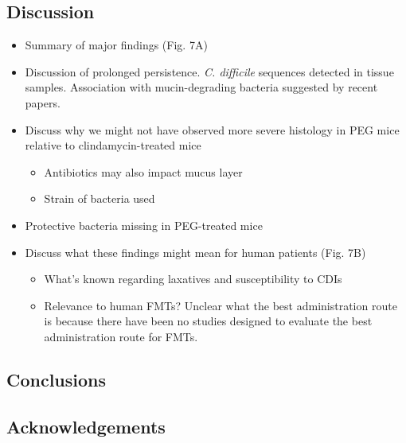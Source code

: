 \documentclass[
  11pt,
]{article}
\providecommand{\tightlist}{%
  \setlength{\itemsep}{0pt}\setlength{\parskip}{0pt}}
\begin{document}
\hypertarget{discussion}{%
\subsection{Discussion}\label{discussion}}

\begin{itemize}
\item
  Summary of major findings (Fig. 7A)
\item
  Discussion of prolonged persistence. \emph{C. difficile} sequences
  detected in tissue samples. Association with mucin-degrading bacteria
  suggested by recent papers.
\item
  Discuss why we might not have observed more severe histology in PEG
  mice relative to clindamycin-treated mice

  \begin{itemize}
  \tightlist
  \item
    Antibiotics may also impact mucus layer
  \item
    Strain of bacteria used
  \end{itemize}
\item
  Protective bacteria missing in PEG-treated mice
\item
  Discuss what these findings might mean for human patients (Fig. 7B)

  \begin{itemize}
  \tightlist
  \item
    What's known regarding laxatives and susceptibility to CDIs
  \item
    Relevance to human FMTs? Unclear what the best administration route
    is because there have been no studies designed to evaluate the best
    administration route for FMTs.
  \end{itemize}
\end{itemize}

\hypertarget{conclusions}{%
\subsection{Conclusions}\label{conclusions}}

\hypertarget{acknowledgements}{%
\subsection{Acknowledgements}\label{acknowledgements}}
\end{document}
